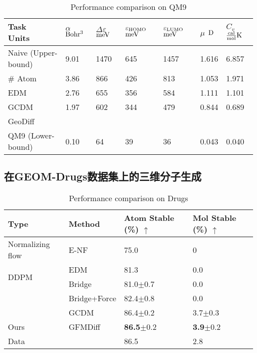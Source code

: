 \begin{table}[h]
    \centering
    \caption{Performance comparison on QM9}
    \label{tab:exp_qm9_condition}
    \begin{tabular}{lllllll}
    \hline
    \makecell[l]{Task\\Units} & \makecell[l]{$\alpha$\\${\rm Bohr^3}$} & \makecell[l]{$\Delta \varepsilon$\\${\rm meV}$} & \makecell[l]{$\varepsilon_{{\rm HOMO}}$\\${\rm meV}$} & \makecell[l]{$\varepsilon_{{\rm LUMO}}$\\${\rm meV}$} & \makecell[l]{$\mu$\\${\rm D}$} & \makecell[l]{$C_v$\\$\frac{{\rm cal}}{{\rm mol}}{\rm K}$} \\
    \hline
    Naive (Upper-bound) & 9.01 & 1470 & 645 & 1457 & 1.616 & 6.857 \\
    \# Atom & 3.86 & 866 & 426 & 813 & 1.053 & 1.971 \\
    EDM & 2.76 & 655 & 356 & 584 & 1.111 & 1.101 \\
    GCDM & 1.97 & 602 & 344 & 479 & 0.844 & 0.689 \\
    GeoDiff &  &  &  &  &  & \\
    QM9 (Lower-bound) & 0.10 & 64 & 39 & 36 & 0.043 & 0.040 \\
    \hline
    \end{tabular}
\end{table}


\subsection{在GEOM-Drugs数据集上的三维分子生成}

\begin{table}[h]
    \centering
    \caption{Performance comparison on Drugs}
    \label{tab:exp_drugs}
    \begin{tabular}{llll}
    \hline
    Type & Method & Atom Stable (\%) $\uparrow$ & Mol Stable (\%) $\uparrow$ \\
    \hline
    Normalizing flow & E-NF & 75.0 & 0 \\
    \multirow{2}{*}{DDPM}
    & EDM  & 81.3 & 0.0 \\
    & Bridge & 81.0$\pm$0.7 & 0.0 \\
    & Bridge+Force & 82.4$\pm$0.8 & 0.0 \\
    & GCDM & 86.4$\pm$0.2 & 3.7$\pm$0.3 \\
    \hline
    Ours & GFMDiff & \textbf{86.5}$\pm$0.2 & \textbf{3.9}$\pm$0.2 \\
    \hline
    Data &  & 86.5 & 2.8 \\
    \hline
    \end{tabular}
\end{table}

